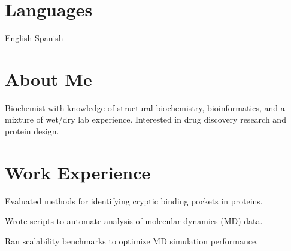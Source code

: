 \documentclass[]{deedy-resume-openfont}
\begin{document}
\begin{minipage}[t]{0.33\textwidth}

\section{Languages}
 \textbullet{}   English \textbullet{} Spanish \\


\end{minipage} 
\hfill
\begin{minipage}[t]{0.66\textwidth} 


\section{About Me}
Biochemist with knowledge of structural biochemistry, bioinformatics, and a mixture of wet/dry lab experience. Interested in drug discovery research and protein design. %
\sectionsep


\section{Work Experience}
\sectionsep
\begin{tightemize}
\item Evaluated methods for identifying cryptic binding pockets in proteins.\item Wrote scripts to automate analysis of molecular dynamics (MD) data. \item Ran scalability benchmarks to optimize MD simulation performance.  \end{tightemize}
\sectionsep



\end{minipage}
\end{document}
